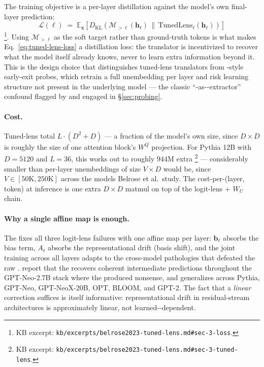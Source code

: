 The training objective is a per-layer distillation against the model's
own final-layer prediction:
\begin{equation}
  \mathcal{L}(\ell)
  \;=\;
  \mathbb{E}_\mathbf{x}\!\left[D_{\mathrm{KL}}\!\left(\mathcal{M}_{>\ell}(\mathbf{h}_\ell)
  \,\big\|\,\mathrm{TunedLens}_\ell(\mathbf{h}_\ell)\right)\right]
  \label{eq:tuned-lens-loss}
\end{equation}
\citep[\S 3, Eq.~9]{belrose2023-tuned-lens}\footnote{KB excerpt:
\nolinkurl{kb/excerpts/belrose2023-tuned-lens.md#sec-3-loss}.}.
Using $\mathcal{M}_{>\ell}$ as the soft target rather than ground-truth
tokens is what makes Eq.~\eqref{eq:tuned-lens-loss} a distillation loss:
the translator is incentivized to recover what the model itself already
knows, never to learn extra information beyond it. This is the design
choice that distinguishes tuned-lens translators from
\citet{alain-bengio-2017}-style early-exit probes, which retrain a full
unembedding per layer and risk learning structure not present in the
underlying model — the classic ``-as--extractor'' confound
flagged by \citet{hewitt2019-control-tasks} and engaged in
\S\ref{sec:probing}.

\paragraph{Cost.} Tuned-lens  total $L \cdot (D^2 + D)$ — a
fraction of the model's own size, since $D \times D$ is roughly the
size of one attention block's $W^Q$ projection. For Pythia 12B with
$D = 5120$ and $L = 36$, this works out to roughly $944$M extra
 \citep[\S 3.2]{belrose2023-tuned-lens}\footnote{KB excerpt:
\nolinkurl{kb/excerpts/belrose2023-tuned-lens.md#sec-3-tuned-lens}.} ---
considerably smaller than per-layer unembeddings of size
$V \times D$ would be, since $V \in [50\text{K}, 250\text{K}]$ across
the models Belrose et al.\ study. The cost-per-(layer, token) at
inference is one extra $D \times D$ matmul on top of the logit-lens
 + $W_U$ chain.

\paragraph{Why a single affine map is enough.} The  fixes
all three logit-lens failures with one affine map per layer:
$\mathbf{b}_\ell$ absorbs the bias term, $A_\ell$ absorbs the
representational drift (basis shift), and the joint training across all
layers adapts to the cross-model pathologies that defeated the raw
. \citet[Fig.~1]{belrose2023-tuned-lens} report that the
 recovers coherent intermediate predictions throughout the
GPT-Neo-2.7B stack where the  produced nonsense, and
generalizes across Pythia, GPT-Neo, GPT-NeoX-20B, OPT, BLOOM, and
GPT-2. The fact that a \emph{linear} correction suffices is itself
informative: representational drift in residual-stream architectures is
approximately linear, not learned--dependent.

